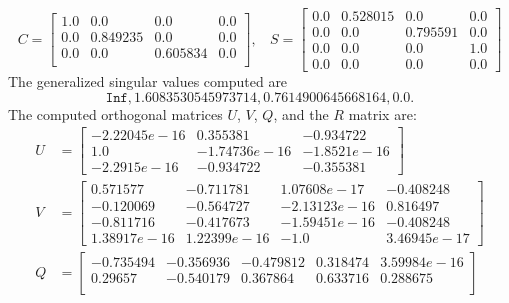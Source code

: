 \begin{example}
{\begin{enumerate}[(1).]
            \begin{equation*}
                C = \begin{bmatrix}
                 1.0 & 0.0      & 0.0      & 0.0 \\
                 0.0 & 0.849235 & 0.0      & 0.0 \\
                 0.0 & 0.0      & 0.605834 & 0.0 \\
                \end{bmatrix} , \ \ \ \
                S = \begin{bmatrix}
                 0.0 & 0.528015 & 0.0       & 0.0 \\
                 0.0 & 0.0      & 0.795591  & 0.0 \\
                 0.0 & 0.0      & 0.0       & 1.0 \\
                 0.0 & 0.0      & 0.0       & 0.0
                \end{bmatrix}
            \end{equation*}
The generalized singular values computed are 
\[ 
\texttt{Inf}, 1.6083530545973714, 0.7614900645668164, 0.0.
\] 
The computed orthogonal matrices $U$, $V$, $Q$, and the $R$ matrix are: 
            \begin{align*}
                U &= \begin{bmatrix}
                     -2.22045e-16 &  0.355381  &   -0.934722  \\
                      1.0   &       -1.74736e-16 &  -1.8521e-16 \\
                     -2.2915e-16 &  -0.934722  &   -0.355381  
                \end{bmatrix} \\
                V &= \begin{bmatrix}
                      0.571577  &   -0.711781  &    1.07608e-17 & -0.408248 \\  
                     -0.120069  &   -0.564727  &   -2.13123e-16 &  0.816497 \\  
                     -0.811716  &   -0.417673  &   -1.59451e-16 & -0.408248 \\   
                      1.38917e-16 &  1.22399e-16 & -1.0     &      3.46945e-17
                \end{bmatrix} \\
                Q &= \begin{bmatrix}
                     -0.735494 & -0.356936 & -0.479812 &  0.318474  &  3.59984e-16 \\
                      0.29657 &  -0.540179 &  0.367864 &  0.633716  &  0.288675 \\ 

\end{bmatrix}
\end{align*}
\end{enumerate}}
\end{example}
